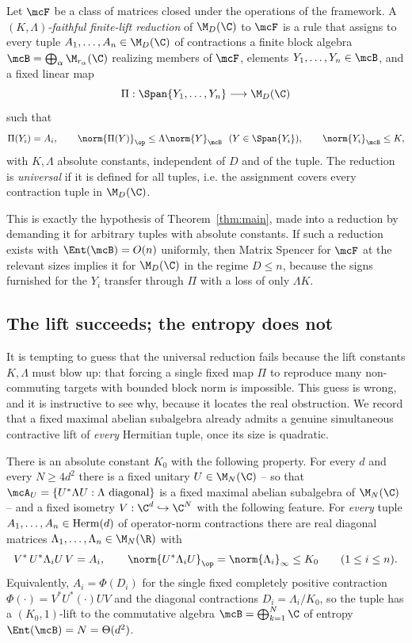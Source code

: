 \begin{definition}\label{def:reduction}
Let $\mcF$ be a class of matrices closed under the operations of the framework. A
\emph{$(K,\Lambda)$-faithful finite-lift reduction} of $\M_D(\C)$ to $\mcF$ is a
rule that assigns to every tuple $A_1,\ldots,A_n\in\M_D(\C)$ of contractions a
finite block algebra $\mcB=\bigoplus_\alpha\M_{r_\alpha}(\C)$ realizing members of
$\mcF$, elements $Y_1,\ldots,Y_n\in\mcB$, and a fixed linear map
\[
\Pi:\Span\{Y_1,\ldots,Y_n\}\longrightarrow\M_D(\C)
\]
such that
\[
\Pi(Y_i)=A_i,\qquad
\norm{\Pi(Y)}_{\op}\le\Lambda\norm{Y}_{\mcB}
\ \ (Y\in\Span\{Y_i\}),\qquad
\norm{Y_i}_{\mcB}\le K,
\]
with $K,\Lambda$ absolute constants, independent of $D$ and of the tuple. The
reduction is \emph{universal} if it is defined for all tuples, i.e. the assignment
covers every contraction tuple in $\M_D(\C)$.
\end{definition}

This is exactly the hypothesis of Theorem~\ref{thm:main}, made into a reduction by
demanding it for arbitrary tuples with absolute constants. If such a reduction
exists with $\Ent(\mcB)=O(n)$ uniformly, then Matrix Spencer for $\mcF$ at the
relevant sizes implies it for $\M_D(\C)$ in the regime $D\le n$, because the
signs furnished for the $Y_i$ transfer through $\Pi$ with a loss of only
$\Lambda K$.

\subsection{The lift succeeds; the entropy does not}
\label{subsec:masa}

It is tempting to guess that the universal reduction fails because the lift
constants $K,\Lambda$ must blow up: that forcing a single fixed map $\Pi$ to
reproduce many non-commuting targets with bounded block norm is impossible. This
guess is wrong, and it is instructive to see why, because it locates the real
obstruction. We record that a fixed maximal abelian subalgebra already admits a
genuine simultaneous contractive lift of \emph{every} Hermitian tuple, once its
size is quadratic.

\begin{proposition}
\label{prop:masalift}
There is an absolute constant $K_0$ with the following property. For every $d$ and
every $N\ge 4d^2$ there is a fixed unitary $U\in\M_N(\C)$ -- so that
$\mcA_U=\{U^*\Lambda U:\Lambda\ \text{diagonal}\}$ is a fixed maximal abelian
subalgebra of $\M_N(\C)$ -- and a fixed isometry $V:\C^d\hookrightarrow\C^N$ with
the following feature. For \emph{every} tuple $A_1,\ldots,A_n\in\mathrm{Herm}(d)$ of
operator-norm contractions there are real diagonal matrices
$\Lambda_1,\ldots,\Lambda_n\in\M_N(\R)$ with
\[
V^*\,U^*\Lambda_i U\,V=A_i,
\qquad
\norm{U^*\Lambda_iU}_{\op}=\norm{\Lambda_i}_\infty\le K_0
\qquad(1\le i\le n).
\]
Equivalently, $A_i=\Phi(D_i)$ for the single fixed completely positive contraction
$\Phi(\cdot)=V^*U^*(\cdot)UV$ and the diagonal contractions $D_i=\Lambda_i/K_0$,
so the tuple has a $(K_0,1)$-lift to the commutative algebra
$\mcB=\bigoplus_{k=1}^N\C$ of entropy $\Ent(\mcB)=N=\Theta(d^2)$.
\end{proposition}

